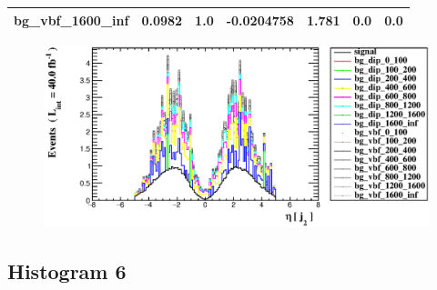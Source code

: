 \documentclass[a4paper, 10pt]{article}
\begin{document}
\begin{table}[H]
\begin{center}
\begin{tabular}{|m{23.0mm}|m{23.0mm}|m{18.0mm}|m{19.0mm}|m{19.0mm}|m{19.0mm}|m{19.0mm}|}
      \hline
      {\cellcolor{white}         bg\_vbf\_1600\_inf}& {\cellcolor{white}         0.0982}& {\cellcolor{white}         1.0}& {\cellcolor{white}         -0.0204758}& {\cellcolor{white}         1.781}& {\cellcolor{green}         0.0}& {\cellcolor{green}         0.0}\\
\hline
    \end{tabular}
  \end{center}
\end{table}

\begin{figure}[H]
  \begin{center}
    \includegraphics[scale=0.45]{selection_4.eps}\\
\caption{   }
  \end{center}
\end{figure}
      \newpage
\subsection{ Histogram 6}
\end{document}
